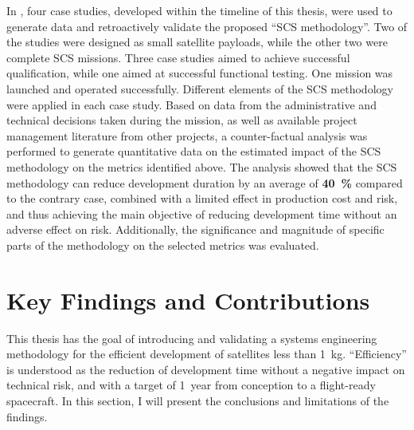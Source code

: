 \documentclass[a4paper,nobib,justified,final]{tufte-book}
\begin{document}
\begin{fullwidth}
In , four case studies, developed within the timeline of this thesis, were used to generate data and retroactively validate the proposed ``\acs{SCS} methodology''.
Two of the studies were designed as small satellite payloads, while the other two were complete \acs{SCS} missions. 
Three case studies aimed to achieve successful qualification, while one aimed at successful functional testing.
One mission was launched and operated successfully.
Different elements of the \acs{SCS} methodology were applied in each case study.
Based on data from the administrative and technical decisions taken during the mission, as well as available project management literature from other projects, a counter-factual analysis was performed to generate quantitative data on the estimated impact of the \acs{SCS} methodology on the metrics identified above.
The analysis showed that the \acs{SCS} methodology can reduce development duration by an average of \textbf{\qty{40}{\percent}} compared to the contrary case, combined with a limited effect in production cost and risk, and thus achieving the main objective of reducing development time without an adverse effect on risk.
Additionally, the significance and magnitude of specific parts of the methodology on the selected metrics was evaluated. 

\section{Key Findings and Contributions}

This thesis has the goal of introducing and validating a systems engineering methodology for the efficient development of satellites less than \SI{1}{\kilo\gram}. ``Efficiency'' is understood as the reduction of development time without a negative impact on technical risk, and with a target of \qty{1}{year} from conception to a flight-ready spacecraft. In this section, I will present the conclusions and limitations of the findings.


\end{fullwidth}
\end{document}
